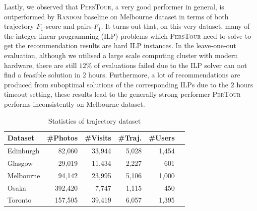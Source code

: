 Lastly, we observed that \textsc{PersTour}, a very good performer in general, is outperformed by \textsc{Random} baseline
on Melbourne dataset in terms of both trajectory $F_1$-score and pairs-$F_1$.
It turns out that, on this very dataset, many of the integer linear programming (ILP) problems
which \textsc{PersTour} need to solve to get the recommendation results are hard ILP instances.
In the leave-one-out evaluation, although we utilised a large scale computing cluster with modern hardware,
there are still $12\%$ of evaluations failed due to the ILP solver can not find a feasible solution in $2$ hours.
Furthermore, a lot of recommendations are produced from suboptimal solutions of the corresponding ILPs due to
the $2$ hours timeout setting, these results lead to the generally strong performer \textsc{PerTour} performs
inconsistently on Melbourne dataset.




\begin{table}
\caption{Statistics of trajectory dataset}
\label{tab:data}
\centering\small
\begin{tabular}{lrrrrr} \hline
\textbf{Dataset} & \textbf{\#Photos} & \textbf{\#Visits} & \textbf{\#Traj.} & \textbf{\#Users} \\ \hline
Edinburgh & 82,060 & 33,944 & 5,028 & 1,454 \\
Glasgow & 29,019 & 11,434 & 2,227 & 601 \\
Melbourne & 94,142 & 23,995 & 5,106 & 1,000 \\
Osaka & 392,420 & 7,747 & 1,115 & 450 \\
Toronto & 157,505 & 39,419 & 6,057 & 1,395 \\
\hline
\end{tabular}
\end{table}


